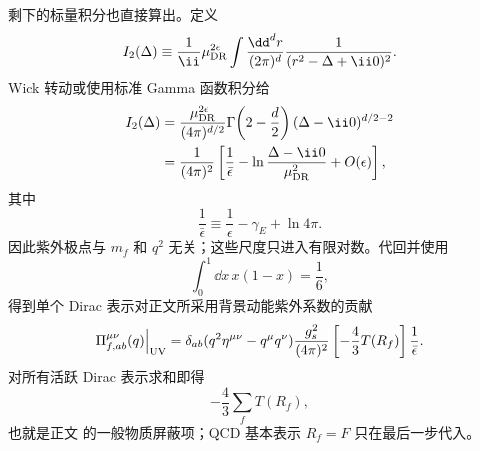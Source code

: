 \begin{derivation}
剩下的标量积分也直接算出。定义
\begin{equation*}
 I_2(\Delta)
 \equiv\frac1{\ii}\mu_{\rm DR}^{2\epsilon}
 \int\frac{\dd^d r}{(2\pi)^d}
 \frac1{(r^2-\Delta+\ii0)^2}.
\end{equation*}
Wick 转动或使用标准 Gamma 函数积分给
\begin{align*}
 I_2(\Delta)
 &=\frac{\mu_{\rm DR}^{2\epsilon}}
 {(4\pi)^{d/2}}
 \Gamma\!\left(2-\frac d2\right)
 (\Delta-\ii0)^{d/2-2}\\
 &=\frac1{(4\pi)^2}
 \left[
 \frac1{\bar\epsilon}
 -\ln\frac{\Delta-\ii0}{\mu_{\rm DR}^2}
 +O(\epsilon)
 \right],
\end{align*}
其中
\begin{equation*}
 \frac1{\bar\epsilon}
 \equiv\frac1\epsilon-\gamma_E+\ln4\pi.
\end{equation*}
因此紫外极点与 $m_f$ 和 $q^2$ 无关；这些尺度只进入有限对数。代回并使用
\begin{equation*}
 \int_0^1\dd x\,x(1-x)=\frac16,
\end{equation*}
得到单个 Dirac 表示对正文所采用背景动能紫外系数的贡献
\begin{equation*}
 \Pi_{f,ab}^{\mu\nu}(q)\Big|_{\rm UV}
 =\delta_{ab}(q^2\eta^{\mu\nu}-q^\mu q^\nu)
 \frac{g_s^2}{(4\pi)^2}
 \left[-\frac43T(R_f)\right]
 \frac1{\bar\epsilon}.
\end{equation*}
对所有活跃 Dirac 表示求和即得
\begin{equation*}
 -\frac43\sum_fT(R_f),
\end{equation*}
也就是正文 的一般物质屏蔽项；QCD 基本表示 $R_f=F$ 只在最后一步代入。
\end{derivation}
